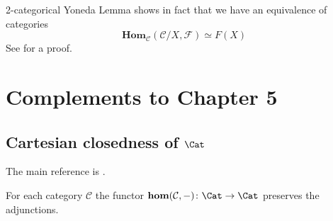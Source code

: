 \begin{rmk}
2-categorical Yoneda Lemma shows in fact that we have an equivalence of categories
\[
\mathbf{Hom}_{\mathcal C}(\mathcal C / X, \mathcal F) \simeq F(X)
\]
See  for a proof.
\end{rmk}

\section{Complements to Chapter 5}

\subsection{Cartesian closedness of $\Cat$}

The main reference is .

\begin{lemma} \label{lemma internal hom adjunctions}
For each category $\mathcal C$ the functor $\mathbf{hom}(\mathcal C, -) \colon \Cat \to \Cat$ preserves the adjunctions.
\end{lemma}

\printbibliography[heading = local, category = simpsheaf]
